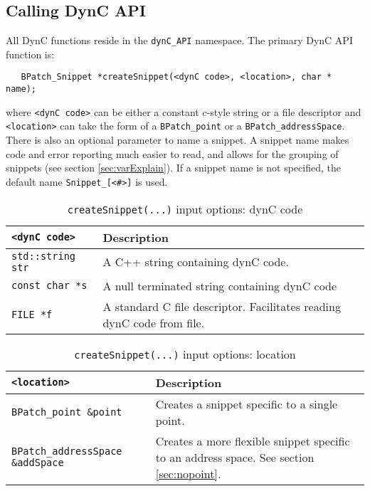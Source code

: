 \documentclass{article}
\begin{document}

\subsection{Calling DynC API}
All DynC functions reside in the \verb!dynC_API! namespace. The primary DynC API function is:
\begin{lstlisting}
   BPatch_Snippet *createSnippet(<dynC code>, <location>, char * name);
\end{lstlisting}
where \verb!<dynC code>! can be either a constant c-style string or a file descriptor and \verb!<location>! can take the form of a \verb!BPatch_point! or a \verb!BPatch_addressSpace!. There is also an optional parameter to name a snippet. A snippet name makes code and error reporting much easier to read, and allows for the grouping of snippets (see section \ref{sec:varExplain}). If a snippet name is not specified, the default name \verb!Snippet_[<#>]! is used.
\\

\begin{centering}

\begin{table}[!th]
\begin{tabular}{|l|p{11cm}|}
\hline
\verb!<dynC code>! & Description\\
\hline
\verb!std::string str! & A C++ string containing dynC code.\\
\hline
\verb!const char *s! & A null terminated string containing dynC code\\
\hline 
\verb!FILE *f! & A standard C file descriptor. Facilitates reading dynC code from file.\\
\hline

\end{tabular}
\caption{\verb!createSnippet(...)! input options: dynC code}
\end{table}

\begin{table}[!th]
\begin{tabular}{|l|p{8cm}|}
\hline
\verb!<location>! & Description\\
\hline
\verb!BPatch_point &point! & Creates a snippet specific to a single point.\\
\hline
\verb!BPatch_addressSpace &addSpace! & Creates a more flexible snippet specific to an address space. See section \ref{sec:nopoint}.\\
\hline
\end{tabular}
\caption{\verb!createSnippet(...)! input options: location}
\end{table}

\end{centering}
\end{document}
